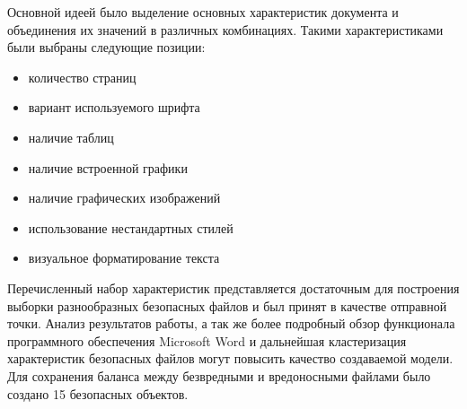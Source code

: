 Основной идеей было выделение основных характеристик документа и объединения их значений в различных комбинациях.
Такими характеристиками были выбраны следующие позиции:
\begin{itemize}
\item количество страниц
\item вариант используемого шрифта
\item наличие таблиц
\item наличие встроенной графики
\item наличие графических изображений
\item использование нестандартных стилей
\item визуальное форматирование текста
\end{itemize}

Перечисленный набор характеристик представляется достаточным для построения выборки разнообразных безопасных файлов и был принят в качестве отправной точки.
Анализ результатов работы, а так же более подробный обзор функционала программного обеспечения Microsoft Word и дальнейшая кластеризация характеристик безопасных файлов могут повысить качество создаваемой модели.
Для сохранения баланса между безвредными и вредоносными файлами было создано 15 безопасных объектов.